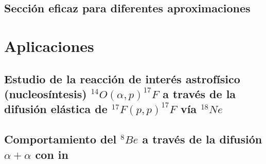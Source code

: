\documentclass[fleqn,10pt]{SelfArx} %
\begin{document}
\subsection{Sección eficaz para diferentes aproximaciones}


\section{Aplicaciones}

\subsection{Estudio de la reacción de interés astrofísico (nucleosíntesis)  $^{14}O(\alpha,p)^{17}F$ a través de la difusión elástica de $^{17}F(p,p)^{17}F$ vía $^{18}Ne$}

\subsection{Comportamiento del $^8Be$ a través de la difusión $\alpha+\alpha$ con in }









\newpage
{}



\end{document}
